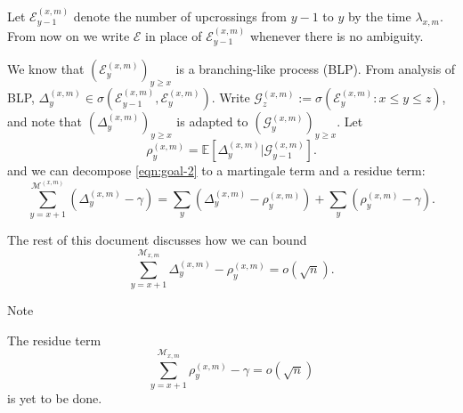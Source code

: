 Let $\mathcal{E}_{y-1}^{(x,m)}$ denote the number of upcrossings from $y-1$ to $y$ by the time $\lambda_{x, m}$.
	From now on we write $\mathcal{E}$ in place of $\mathcal{E}_{y-1}^{(x,m)}$ whenever there is no ambiguity. 
	
	We know that $\left( \mathcal{E}_y^{(x,m)} \right) _{y \ge  x}$ is a branching-like process (BLP). From analysis of BLP, $\Delta_y^{(x,m)} \in \sigma\left( \mathcal{E}_{y-1}^{(x,m)}, \mathcal{E}_y^{(x,m)} \right) $. 
	Write $\mathcal{G}_{z}^{(x,m)} := \sigma\left( \mathcal{E}_y^{(x,m)}: x \le y \le z \right) $, and note that $\left( \Delta_y^{(x,m)} \right) _{y \ge  x}$ is adapted to $\left( \mathcal{G}_y^{(x,m)} \right) _{y \ge  x}$.
	Let
 \begin{equation*}
	 \rho_y^{(x,m)} = \mathbb{E}\left[ \Delta_y^{(x,m)} | \mathcal{G}_{y-1} ^{(x,m)} \right] 
.\end{equation*} 
and we can decompose \eqref{eqn:goal-2} to a martingale term and a residue term:
\[
		\sum_{y = x+1}^{\mathcal{M}^{(x,m)}} \left(\Delta_y^{(x,m)} - \gamma\right) = \sum_y \left(\Delta_y^{(x,m)} - \rho_y^{(x,m)}\right) + \sum_y \left(\rho_y^{(x,m)} - \gamma\right)
.\] 

The rest of this document discusses how we can bound
\begin{equation}
	\label{eqn:msum-goal-1}
	\sum_{y = x+1}^{\mathcal{M}_{x,m}} \Delta_y^{(x,m)} - \rho_y^{(x,m)} = o(\sqrt{n}) 
.\end{equation} 


\begin{note}{Note}
	
The residue term
\begin{equation}
	\label{eqn:msum-goal-2}
	\sum_{y = x+1}^{\mathcal{M}_{x,m}} \rho_y^{(x,m)} - \gamma = o(\sqrt{n}) 
\end{equation}
is yet to be done.
\end{note}
